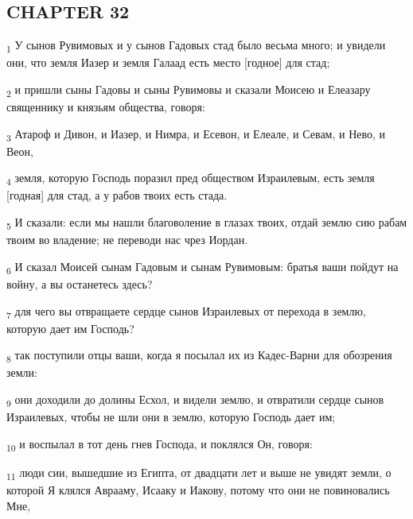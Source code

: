 \subsection{CHAPTER 32}
\begin{tcolorbox}
\textsubscript{1} У сынов Рувимовых и у сынов Гадовых стад было весьма много; и увидели они, что земля Иазер и земля Галаад есть место [годное] для стад;
\end{tcolorbox}
\begin{tcolorbox}
\textsubscript{2} и пришли сыны Гадовы и сыны Рувимовы и сказали Моисею и Елеазару священнику и князьям общества, говоря:
\end{tcolorbox}
\begin{tcolorbox}
\textsubscript{3} Атароф и Дивон, и Иазер, и Нимра, и Есевон, и Елеале, и Севам, и Нево, и Веон,
\end{tcolorbox}
\begin{tcolorbox}
\textsubscript{4} земля, которую Господь поразил пред обществом Израилевым, есть земля [годная] для стад, а у рабов твоих есть стада.
\end{tcolorbox}
\begin{tcolorbox}
\textsubscript{5} И сказали: если мы нашли благоволение в глазах твоих, отдай землю сию рабам твоим во владение; не переводи нас чрез Иордан.
\end{tcolorbox}
\begin{tcolorbox}
\textsubscript{6} И сказал Моисей сынам Гадовым и сынам Рувимовым: братья ваши пойдут на войну, а вы останетесь здесь?
\end{tcolorbox}
\begin{tcolorbox}
\textsubscript{7} для чего вы отвращаете сердце сынов Израилевых от перехода в землю, которую дает им Господь?
\end{tcolorbox}
\begin{tcolorbox}
\textsubscript{8} так поступили отцы ваши, когда я посылал их из Кадес-Варни для обозрения земли:
\end{tcolorbox}
\begin{tcolorbox}
\textsubscript{9} они доходили до долины Есхол, и видели землю, и отвратили сердце сынов Израилевых, чтобы не шли они в землю, которую Господь дает им;
\end{tcolorbox}
\begin{tcolorbox}
\textsubscript{10} и воспылал в тот день гнев Господа, и поклялся Он, говоря:
\end{tcolorbox}
\begin{tcolorbox}
\textsubscript{11} люди сии, вышедшие из Египта, от двадцати лет и выше не увидят земли, о которой Я клялся Аврааму, Исааку и Иакову, потому что они не повиновались Мне,
\end{tcolorbox}
